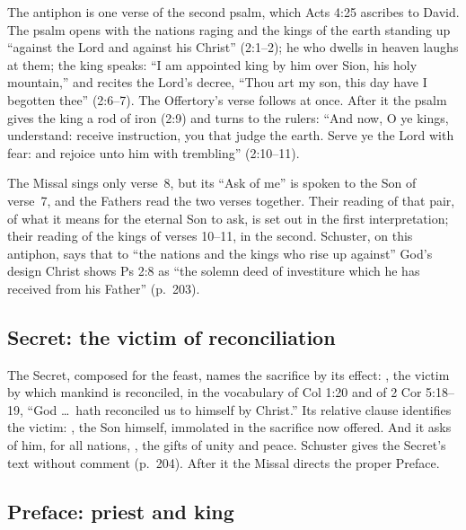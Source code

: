 The antiphon is one verse of the second psalm, which Acts 4:25 ascribes to
David. The psalm opens with the nations raging and the kings of the earth
standing up ``against the Lord and against his Christ'' (2:1--2); he who dwells
in heaven laughs at them; the king speaks: ``I am appointed king by him over
Sion, his holy mountain,'' and recites the Lord's decree, ``Thou art my son,
this day have I begotten thee'' (2:6--7). The Offertory's verse follows at once.
After it the psalm gives the king a rod of iron (2:9) and turns to the rulers:
``And now, O ye kings, understand: receive instruction, you that judge the
earth. Serve ye the Lord with fear: and rejoice unto him with trembling''
(2:10--11).

The Missal sings only verse~8, but its ``Ask of me'' is spoken to the Son of
verse~7, and the Fathers read the two verses together. Their reading of that
pair, of what it means for the eternal Son to ask, is set out in the first
interpretation; their reading of the kings of verses 10--11, in the second.
Schuster, on this antiphon, says that to ``the nations and the kings who rise
up against'' God's design Christ shows Ps 2:8 as ``the solemn deed of
investiture which he has received from his Father'' (p.~203).

\subsection{Secret: the victim of reconciliation}
\label{sec:element-secret}

The Secret, composed for the feast, names the sacrifice by its effect:
, the victim by which mankind
is reconciled, in the vocabulary of Col 1:20 and of 2 Cor 5:18--19, ``God
\dots\ hath reconciled us to himself by Christ.'' Its relative clause
identifies the victim: , the
Son himself, immolated in the sacrifice now offered. And it asks of him, for all
nations, , the gifts of unity and peace. Schuster gives
the Secret's text without comment (p.~204). After it the Missal directs the
proper Preface.

\subsection{Preface: priest and king}
\label{sec:element-preface}

